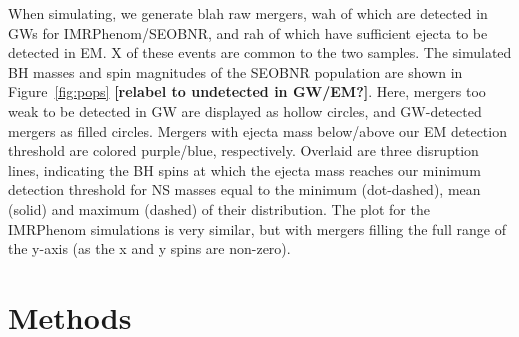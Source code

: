 \documentclass[twocolumn]{aastex63}
\begin{document}
When simulating, we generate blah raw mergers, wah of which are detected in GWs for IMRPhenom/SEOBNR, and rah of which have sufficient ejecta to be detected in EM. X of these events are common to the two samples. The simulated BH masses and spin magnitudes of the SEOBNR population are shown in Figure~\ref{fig:pops} {\bf [relabel to undetected in GW/EM?]}. Here, mergers too weak to be detected in GW are displayed as hollow circles, and GW-detected mergers as filled circles. Mergers with ejecta mass below/above our EM detection threshold are colored purple/blue, respectively. Overlaid are three disruption lines, indicating the BH spins at which the ejecta mass reaches our minimum detection threshold for NS masses equal to the minimum (dot-dashed), mean (solid) and maximum (dashed) of their distribution. The plot for the IMRPhenom simulations is very similar, but with mergers filling the full range of the y-axis (as the x and y spins are non-zero).

\begin{figure*}[ht!]
\caption{Blah.\label{fig:pops}}
\end{figure*}

\section{Methods} \label{sec:methods}
\end{document}
